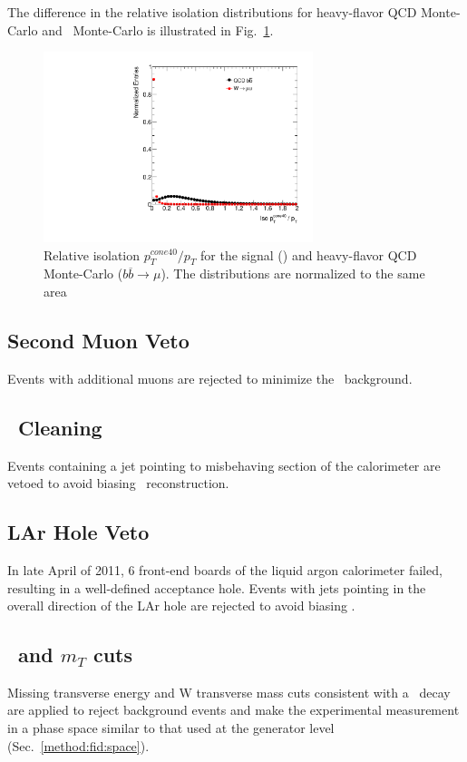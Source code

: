 The difference in the relative isolation distributions for heavy-flavor QCD Monte-Carlo and \Wmn\ Monte-Carlo is illustrated in Fig.~\ref{fig:event:isoplot}.

\begin{figure}[htb]
  \begin{center}
    \includegraphics[width=0.7\textwidth]{event/fig/TEST_ISOPLOT_NEG_lepton_ptiso40r}
    \caption{Relative isolation $p_T^{cone40}/{p_T}$ for the signal (\Wmn) and heavy-flavor QCD Monte-Carlo ($b\overline{b} \rightarrow \mu$). The distributions are normalized to the same area}
    \label{fig:event:isoplot}
  \end{center}
\end{figure}

\subsection{Second Muon Veto}
Events with additional muons are rejected to minimize the \Zmm\ background.

\subsection{\met\ Cleaning}
Events containing a jet pointing to misbehaving section of the calorimeter are vetoed to avoid biasing \met\ reconstruction.

\subsection{LAr Hole Veto}
In late April of 2011, 6 front-end boards of the liquid argon calorimeter failed, resulting in a well-defined acceptance hole. Events with jets pointing in the overall direction of the LAr hole are rejected to avoid biasing \met.

\subsection{\met\ and $m_T$ cuts}
Missing transverse energy and W transverse mass cuts consistent with a \Wmn\ decay are applied to reject background events and make the experimental measurement in a phase space similar to that used at the generator level (Sec.~\ref{method:fid:space}).

